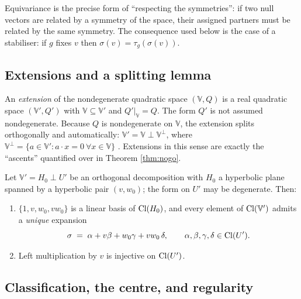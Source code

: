 Equivariance is the precise form of ``respecting the symmetries'': if two null vectors are related by a symmetry of the space, their assigned partners must be related by the same symmetry. The consequence used below is the case of a stabiliser: if $g$ fixes $v$ then $\sigma(v) = \tau_g(\sigma(v))$.

\subsection{Extensions and a splitting lemma}\label{subsec:extensions}

\begin{definition}\label{def:extension}
An \emph{extension} of the nondegenerate quadratic space $(\mathbb{V}, Q)$ is a real quadratic space $(\mathbb{V}', Q')$ with $\mathbb{V} \subseteq \mathbb{V}'$ and $Q'|_{\mathbb{V}} = Q$. The form $Q'$ is not assumed nondegenerate. Because $Q$ is nondegenerate on $\mathbb{V}$, the extension splits orthogonally and automatically: $\mathbb{V}' = \mathbb{V} \perp \mathbb{V}^{\perp}$, where $\mathbb{V}^{\perp} = \{ a \in \mathbb{V}' : a \cdot x = 0 \ \forall x \in \mathbb{V}\}$ \cite{Lam2005}. Extensions in this sense are exactly the ``ascents'' quantified over in Theorem \ref{thm:nogo}.
\end{definition}

\begin{lemma}\label{lem:split}
Let $\mathbb{V}' = H_0 \perp U'$ be an orthogonal decomposition with $H_0$ a hyperbolic plane spanned by a hyperbolic pair $(v, w_0)$; the form on $U'$ may be degenerate. Then:
\begin{enumerate}
\item $\{1, v, w_0, v w_0\}$ is a linear basis of $\mathrm{Cl}(H_0)$, and every element of $\mathrm{Cl}(\mathbb{V}')$ admits a \emph{unique} expansion
\[
\sigma \;=\; \alpha + v\beta + w_0\gamma + v w_0\,\delta, \qquad \alpha, \beta, \gamma, \delta \in \mathrm{Cl}(U').
\]
\item Left multiplication by $v$ is injective on $\mathrm{Cl}(U')$.
\end{enumerate}
\end{lemma}

\subsection{Classification, the centre, and regularity}\label{subsec:classification}

